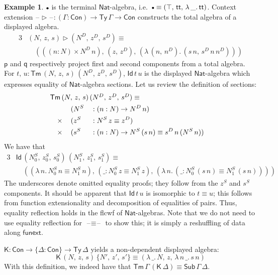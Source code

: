 \documentclass[12pt,a4paper,twoside,openany]{book}
\theoremstyle{remark}
\theoremstyle{definition}
\newtheorem{myexample}{Example}
\theoremstyle{theorem}
\newcommand{\ms}[1]{\mathsf{#1}}
\newcommand{\funext}{\ms{funext}}
\newcommand{\Con}{\mathsf{Con}}
\newcommand{\Sub}{\mathsf{Sub}}
\newcommand{\Tm}{\mathsf{Tm}}
\newcommand{\Ty}{\mathsf{Ty}}
\newcommand{\Id}{\mathsf{Id}}
\renewcommand{\tt}{\mathsf{tt}}
\newcommand{\blank}{\mathord{\hspace{1pt}\text{--}\hspace{1pt}}}
\newcommand{\ext}{\triangleright}
\newcommand{\emptycon}{\scaleobj{.75}\bullet}
\newcommand{\p}{\mathsf{p}}
\newcommand{\q}{\mathsf{q}}
\newcommand{\K}{\mathsf{K}}
\newcommand{\Nat}{\ms{Nat}}
\begin{document}
\begin{myexample}
$\emptycon$ is the terminal $\Nat$-algebra, i.e.\ $\emptycon \equiv
(\top,\,\tt,\,\lambda\,\_.\,\tt)$. Context extension $\blank\ext\blank : (\Gamma
: \Con) \to \Ty\,\Gamma \to \Con$ constructs the total algebra of a displayed
algebra.
\begin{alignat*}{3}
&(N,\,z,\,s) \ext (N^D,\,z^D,\,s^D) \equiv\\
&\hspace{1em}(((n : N) \times N^D\,n),\,(z,\,z^D),\,(\lambda\,(n,\,n^D).\,(s\,n,\,s^D\,n\,n^D)))
\end{alignat*}
$\p$ and $\q$ respectively project first and second components from a total
algebra. For $t,\,u : \Tm\,(N,\,z,\,s)\,(N^D,\,z^D,\,s^D)$, $\Id\,t\,u$ is the
displayed $\Nat$-algebra which expresses equality of $\Nat$-algebra sections.
Let us review the definition of sections:
\begin{alignat*}{3}
&\rlap{$\Tm\,(N,\,z,\,s)\,(N^D,\,z^D,\,s^D) \equiv$}\\
  &\hspace{1em}        \,&&(N^S &&: (n : N) \to N^D\,n)\\
  &\hspace{1em} \times \,&&(z^S &&: N^S\,z \equiv z^D)\\
  &\hspace{1em} \times \,&&(s^S &&: (n : N) \to N^S\,(s\,n) \equiv s^D\,n\,(N^S\,n))
\end{alignat*}
We have that
\begin{alignat*}{3}
  & \Id\,(N^S_0,\,z^S_0,\,s^S_0)\,(N^S_1,\,z^S_1,\,s^S_1) \equiv\\
  & \hspace{1em}((\lambda\,n.\,N^S_0\,n \equiv N^S_1\,n),\,(\_ : N^S_0\,z \equiv N^S_1\,z),\,
  (\lambda\,n.\,(\_ : N^S_0\,(s\,n) \equiv N^S_1\,(s\,n))))
\end{alignat*}
The underscores denote omitted equality proofs; they follow from the $z^S$ and
$s^S$ components. It should be apparent that $\Id\,t\,u$ is isomorphic to $t
\equiv u$; this follows from function extensionality and decomposition of
equalities of pairs. Thus, equality reflection holds in the flcwf of
$\Nat$-algebras. Note that we do not need to use equality reflection for
$\blank\equiv\blank$ to show this; it is simply a reshuffling of data along $\funext$.

$\K : \Con \to \{\Delta : \Con\} \to \Ty\,\Delta$ yields a non-dependent displayed algebra:
\[
\K\,(N,\,z,\,s)\,\{N',\,z',\,s'\} \equiv (\lambda\,\_.\,N,\,z,\,\lambda\,n\,\_.\,s\,n)
\]
With this definition, we indeed have that $\Tm\,\Gamma\,(\K\,\Delta) \equiv
\Sub\,\Gamma\,\Delta$.


\end{myexample}
\end{document}
